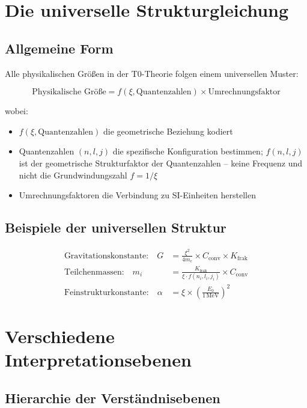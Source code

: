 	\section{Die universelle Strukturgleichung}
	
	\subsection{Allgemeine Form}
	
	Alle physikalischen Größen in der T0-Theorie folgen einem universellen Muster:
	
	\begin{equation}
		\boxed{\text{Physikalische Größe} = f(\xi, \text{Quantenzahlen}) \times \text{Umrechnungsfaktor}}
		\label{eq:universal_pattern}
	\end{equation}
	
	wobei:
	\begin{itemize}
		\item $f(\xi, \text{Quantenzahlen})$ die geometrische Beziehung kodiert
		\item Quantenzahlen $(n,l,j)$ die spezifische Konfiguration bestimmen; $f(n,l,j)$ ist der geometrische Strukturfaktor der Quantenzahlen -- keine Frequenz und nicht die Grundwindungszahl $f = 1/\xi$
		\item Umrechnungsfaktoren die Verbindung zu SI-Einheiten herstellen
	\end{itemize}
	
	\subsection{Beispiele der universellen Struktur}
	
	\begin{align}
		\text{Gravitationskonstante:} \quad G &= \frac{\xi^2}{4m_e} \times C_{\text{conv}} \times K_{\text{frak}} \\
		\text{Teilchenmassen:} \quad m_i &= \frac{K_{\text{frak}}}{\xi \cdot f(n_i,l_i,j_i)} \times C_{\text{conv}} \\
		\text{Feinstrukturkonstante:} \quad \alpha &= \xi \times \left(\frac{E_0}{1\,\mathrm{MeV}}\right)^2
	\end{align}
	
	\section{Verschiedene Interpretationsebenen}
	
	\subsection{Hierarchie der Verständnisebenen}
	
